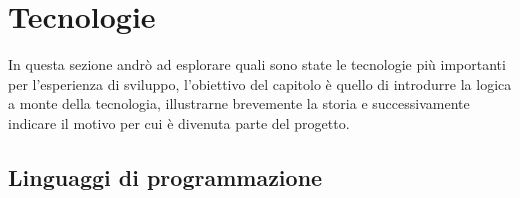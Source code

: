 \chapter{Tecnologie}
In questa sezione andrò ad esplorare quali sono state le tecnologie più importanti per l'esperienza di sviluppo, l'obiettivo del capitolo è quello di introdurre la logica a monte della tecnologia, illustrarne brevemente la storia e successivamente indicare il motivo per cui è divenuta parte del progetto.



\section{Linguaggi di programmazione}

